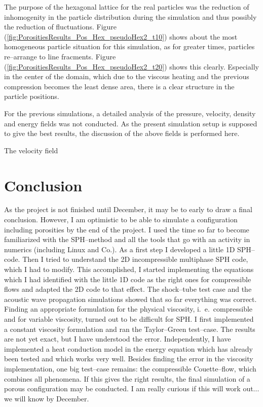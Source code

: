 \documentclass{report}
\begin{document}
The purpose of the hexagonal lattice for the real particles was the reduction of inhomogenity in the particle distribution during the simulation and thus possibly the reduction of fluctuations.  Figure (\ref{fig:PorositiesResults_Pos_Hex_pseudoHex2_t10}) shows about the most homogeneous particle situation for this simulation, as for greater times, particles re--arrange to line fracments. Figure (\ref{fig:PorositiesResults_Pos_Hex_pseudoHex2_t20}) shows this clearly. Especially in the center of the domain, which due to the viscous heating and the previous compression becomes the least dense area, there is a clear structure in the particle positions.

For the previous simulations, a detailed analysis of the pressure, velocity, density and energy fields was not conducted. As the present simulation setup is supposed to give the best results, the discussion of the above fields is performed here.

The velocity field  




 \chapter{Conclusion}
\label{sec:conclusion}
As the project is not finished until December, it may be to early to draw a final conclusion. However, I am optimistic to be able to simulate a configuration including porosities by the end of the project. I used the time so far to become familiarized with the SPH--method and all the tools that go with an activity in numerics (including Linux and Co.). As a first step I developed a little 1D SPH--code. Then I tried to understand the 2D incompressible multiphase SPH code, which I had to modify. This accomplished, I started implementing the equations which I had identified with the little 1D code as the right ones for compressible flows and adapted the 2D code to that effect. The shock--tube test case and the acoustic wave propagation simulations showed that so far everything was correct.
Finding an appropriate formulation for the physical viscosity, i.\ e.\ compressible and for variable viscosity, turned out to be difficult for SPH. I first implemented a constant viscosity formulation and ran the Taylor--Green test--case. The results are not yet exact, but I have understood the error. Independently, I have implemented a heat conduction model in the energy equation which has already been tested and which works very well.
Besides finding the error in the viscosity implementation, one big test--case remains: the compressible Couette--flow, which combines all phenomena.
If this gives the right results, the final simulation of a porous configuration may be conducted. I am really curious if this will work out... we will know by December.
\end{document}
